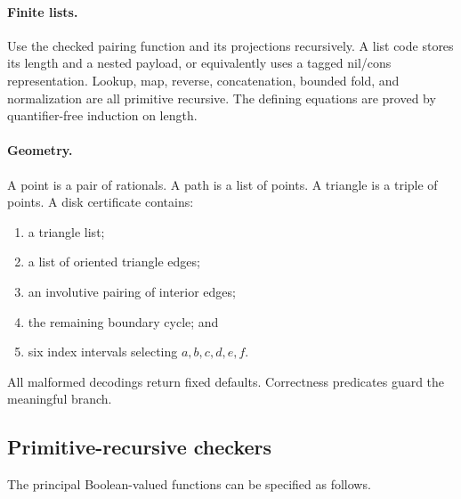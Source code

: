 \paragraph{Finite lists.}
Use the checked pairing function and its projections recursively.  A list code stores its length and a nested payload, or equivalently uses a tagged nil/cons representation.  Lookup, map, reverse, concatenation, bounded fold, and normalization are all primitive recursive.  The defining equations are proved by quantifier-free induction on length.

\paragraph{Geometry.}
A point is a pair of rationals.  A path is a list of points.  A triangle is a triple of points.  A disk certificate contains:
\begin{enumerate}[label=(\arabic*)]
\item a triangle list;
\item a list of oriented triangle edges;
\item an involutive pairing of interior edges;
\item the remaining boundary cycle; and
\item six index intervals selecting \(a,b,c,d,e,f\).
\end{enumerate}
All malformed decodings return fixed defaults.  Correctness predicates guard the meaningful branch.

\subsection{Primitive-recursive checkers}

The principal Boolean-valued functions can be specified as follows.


